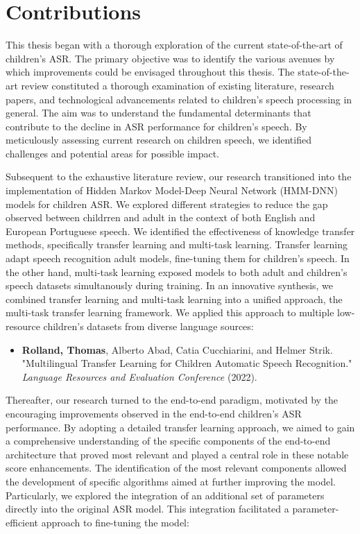 \section{Contributions}
This thesis began with a thorough exploration of the current state-of-the-art of children's ASR. The primary objective was to identify the various avenues by which improvements could be envisaged throughout this thesis. The state-of-the-art review constituted a thorough examination of existing literature, research papers, and technological advancements related to children's speech processing in general. The aim was to understand the fundamental determinants that contribute to the decline in ASR performance for children's speech. By meticulously assessing current research on children speech, we identified challenges and potential areas for possible impact.

Subsequent to the exhaustive literature review, our research transitioned into the implementation of Hidden Markov Model-Deep Neural Network (HMM-DNN) models for children ASR.  We explored different strategies to reduce the gap observed between childrren and adult in the context of both English and European Portuguese speech. We identified the effectiveness of knowledge transfer methods, specifically transfer learning and multi-task learning. Transfer learning adapt speech recognition adult models, fine-tuning them for children's speech. In the other hand, multi-task learning exposed models to both adult and children's speech datasets simultanously during training. In an innovative synthesis, we combined transfer learning and multi-task learning into a unified approach, the multi-task transfer learning framework. We applied this approach to multiple low-resource children's datasets from diverse language sources:
\begin{itemize}
    \item \textbf{Rolland, Thomas}, Alberto Abad, Catia Cucchiarini, and Helmer Strik. "Multilingual Transfer Learning for Children Automatic Speech Recognition." \textit{ Language Resources and Evaluation Conference} (2022).
\end{itemize}

Thereafter, our research turned to the end-to-end paradigm, motivated by the encouraging improvements observed in the end-to-end children's ASR performance. By adopting a detailed transfer learning approach, we aimed to gain a comprehensive understanding of the specific components of the end-to-end architecture that proved most relevant and played a central role in these notable score enhancements. The identification of the most relevant components allowed the development of specific algorithms aimed at further improving the model. Particularly, we explored the integration of an additional set of parameters directly into the original ASR model. This integration facilitated a parameter-efficient approach to fine-tuning the model:

